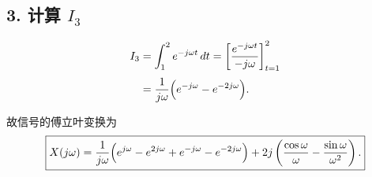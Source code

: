 \documentclass[11pt]{article}
\begin{document}
\subsection{\texorpdfstring{3. 计算
\(I_3\)}{3. 计算 I\_3}}\label{ux8ba1ux7b97-i_3}

\[
\begin{aligned}
I_3 &= \int_{1}^{2} e^{-j\omega t}\,dt
=\left[\frac{e^{-j\omega t}}{-j\omega}\right]_{t=1}^{2}\\[1mm]
&=\frac{1}{j\omega}\Bigl(e^{-j\omega}-e^{-2j\omega}\Bigr).
\end{aligned}
\]

故信号的傅立叶变换为 \[
\boxed{
X(j\omega)=\frac{1}{j\omega}\Bigl(e^{j\omega}-e^{2j\omega}+e^{-j\omega}-e^{-2j\omega}\Bigr)
+2j\left(\frac{\cos\omega}{\omega}-\frac{\sin\omega}{\omega^2}\right).
}
\]
\end{document}
